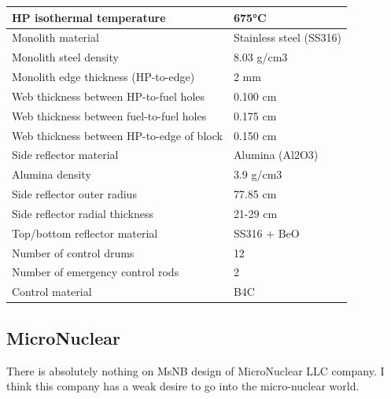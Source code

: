 \documentclass[10pt,a4paper]{article}
\begin{document}
\begin{table} [hbtp]
\begin{center}
\begin{tabular}{l     l}
HP isothermal temperature&675°C        \\
\hline 
Monolith material&Stainless steel (SS316)       \\
Monolith steel density&8.03 g/cm3                         \\
Monolith edge thickness (HP-to-edge)&2 mm                                 \\
Web thickness between HP-to-fuel holes&0.100 cm                            \\
Web thickness between fuel-to-fuel holes&0.175 cm                            \\
Web thickness between HP-to-edge of block&0.150 cm                            \\
\hline 
Side reflector material&Alumina (Al2O3)       \\
Alumina density&3.9 g/cm3                        \\
Side reflector outer radius&77.85 cm                                 \\
Side reflector radial thickness&21-29 cm                            \\
Top/bottom reflector material&SS316 + BeO                            \\
\hline 
Number of control drums&12       \\
Number of emergency control rods&2       \\
Control material&B4C                        \\
\hline 

\end{tabular}
\end{center}
\end{table}

\pagebreak
\subsection{MicroNuclear}
There is absolutely nothing on MsNB design of MicroNuclear LLC company. I think this company has a weak desire to go into the micro-nuclear world. 
\end{document}
